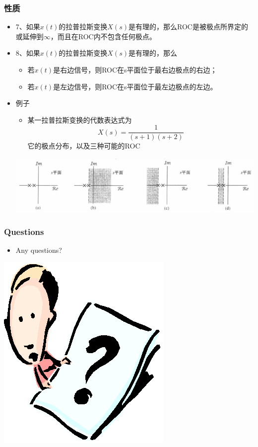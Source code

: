 \documentclass[CJKutf8,dvipsnames,table]{beamer}
\begin{document}
\begin{CJK*}{UTF8}{song}
  \begin{frame}
    \frametitle{性质}
    \begin{itemize}
    \item 7、如果$x(t)$的拉普拉斯变换$X(s)$是有理的，那么ROC是被极点所界定的或延伸到$\infty$，而且在ROC内不包含任何极点。   
    \item 8、如果$x(t)$的拉普拉斯变换$X(s)$是有理的，那么
    	\begin{itemize}
    	\item 若$x(t)$是右边信号，则ROC在s平面位于最右边极点的右边；
    	\item 若$x(t)$是左边信号，则ROC在s平面位于最左边极点的左边。
    	\end{itemize}
	\item 例子
		\begin{itemize}
		\item 某一拉普拉斯变换的代数表达式为
		\[
			X(s) = \frac{1}{(s+1)(s+2)}
		\]
		它的极点分布，以及三种可能的ROC
		\end{itemize}
		\begin{center}
    	\includegraphics[scale=.42]{ss-c-f9-13}
    	\end{center}
    \end{itemize}
  \end{frame}
         
  \begin{frame}
    \frametitle{Questions}
    \begin{itemize}
    \item Any questions?
    \end{itemize}
    \begin{center}
      \includegraphics[scale=.5]{question}
    \end{center}
  \end{frame} 
  

\end{CJK*}
\end{document}
